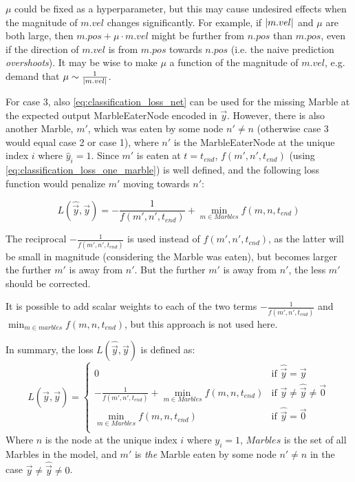 $\mu$ could be fixed as a hyperparameter, but this may cause undesired effects when the  magnitude of $m.vel$ changes significantly. For example, if $\lvert m.vel \rvert$ and $\mu$ are both large, then $m.pos + \mu \cdot m.vel$ might be further from $n.pos$ than $m.pos$, even if the direction of $m.vel$ is from $m.pos$ towards $n.pos$ (i.e. the naive prediction \textit{overshoots}). It may be wise to make $\mu$ a function of the magnitude of $m.vel$, e.g. demand that $\mu \sim \frac{1}{\lvert m.vel \rvert}$.

For case 3, also \eqref{eq:classification_loss_net} can be used for the missing Marble at the expected output MarbleEaterNode encoded in $\vec{y}$. However, there is also another Marble, $m'$, which was eaten by some node $n' \neq n$ (otherwise case 3 would equal case 2 or case 1), where $n'$ is the MarbleEaterNode at the unique index $i$ where $\hat{y}_i = 1$. Since $m'$ is eaten at $t = t_{end}$, $f(m', n', t_{end})$ (using \eqref{eq:classification_loss_one_marble}) is well defined, and the following loss function would penalize $m'$ moving towards $n'$:

\begin{equation}
    L(\hat{\vec{y}}, \vec{y}) = - \frac{1}{f(m', n', t_{end})} + \min_{m \in Marbles} f(m, n, t_{end})
\end{equation}

The reciprocal $- \frac{1}{f(m', n', t_{end})}$ is used instead of $f(m', n', t_{end})$, as the latter will be small in magnitude (considering the Marble was eaten), but becomes larger the further $m'$ is away from $n'$. But the further $m'$ is away from $n'$, the less $m'$ should be corrected.

It is possible to add scalar weights to each of the two terms $- \frac{1}{f(m', n', t_{end})}$ and $\min_{m \in marbles} f(m, n, t_{end})$, but this approach is not used here.

In summary, the loss $L(\hat{\vec{y}}, \vec{y})$ is defined as:
\begin{equation}
    L(\hat{\vec{y}}, \vec{y}) = \begin{cases}
        0 & \text{if } \hat{\vec{y}} = \vec{y} \\
        - \frac{1}{f(m', n', t_{end})} + \min_{m \in Marbles} f(m, n, t_{end}) & \text{if } \vec{y} \neq \hat{\vec{y}} \neq \vec{0}  \\
        \min_{m \in Marbles} f(m, n, t_{end}) & \text{if } \hat{\vec{y}} = \vec{0}\\
    \end{cases}
    \label{eq:classification_loss_full}
\end{equation}
Where $n$ is the node at the unique index $i$ where $y_i = 1$, $Marbles$ is the set of all Marbles in the model, and $m'$ is \textit{the} Marble eaten by some node $n' \neq n$ in the case $\vec{y} \neq \hat{\vec{y}} \neq 0$.

